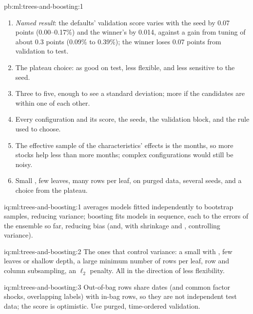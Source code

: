 \begin{solution}{pb:ml:trees-and-boosting:1}
\begin{enumerate}
without adding bias.
\item \emph{Named result}: the defaults' validation score varies with the seed by 0.07 points (0.00--0.17\%) and the
winner's by 0.014, against a gain from tuning of about 0.3 points (0.09\% to 0.39\%); the winner loses 0.07 points from
validation to test.
\item The plateau choice: as good on test, less flexible, and less sensitive to the seed.
\item Three to five, enough to see a standard deviation; more if the candidates are within one of each other.
\item Every configuration and its score, the seeds, the validation block, and the rule used to choose.
\item The effective sample of the characteristics' effects is the months, so more stocks help less than more months;
complex configurations would still be noisy.
\item Small , few leaves, many rows per leaf,  on purged data, several seeds, and a choice
from the plateau.
\end{enumerate}
\end{solution}

\begin{solution}{iq:ml:trees-and-boosting:1}
 averages models fitted independently to bootstrap samples, reducing variance; boosting fits models in sequence,
each to the errors of the ensemble so far, reducing bias (and, with shrinkage and , controlling variance).
\end{solution}

\begin{solution}{iq:ml:trees-and-boosting:2}
The ones that control variance: a small  with , few leaves or shallow depth, a large minimum
number of rows per leaf, row and column subsampling, an $\ell_2$ penalty. All in the direction of less flexibility.
\end{solution}

\begin{solution}{iq:ml:trees-and-boosting:3}
Out-of-bag rows share dates (and common factor shocks, overlapping labels) with in-bag rows, so they are not independent
test data; the score is optimistic. Use purged, time-ordered validation.
\end{solution}

